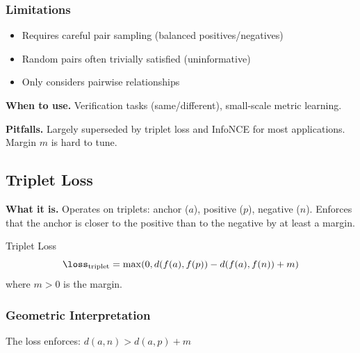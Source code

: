\subsubsection{Limitations}

\begin{itemize}
    \item Requires careful pair sampling (balanced positives/negatives)
    \item Random pairs often trivially satisfied (uninformative)
    \item Only considers pairwise relationships
\end{itemize}

\textbf{When to use.} Verification tasks (same/different), small-scale metric learning.

\textbf{Pitfalls.} Largely superseded by triplet loss and InfoNCE for most applications. Margin $m$ is hard to tune.

\subsection{Triplet Loss}

\textbf{What it is.} Operates on triplets: anchor ($a$), positive ($p$), negative ($n$). Enforces that the anchor is closer to the positive than to the negative by at least a margin.

\begin{mathresult}{Triplet Loss}
\begin{equation}
\loss_{\text{triplet}} = \max(0, d(f(a), f(p)) - d(f(a), f(n)) + m)
\end{equation}
where $m > 0$ is the margin.
\end{mathresult}

\subsubsection{Geometric Interpretation}

The loss enforces: $d(a, n) > d(a, p) + m$

